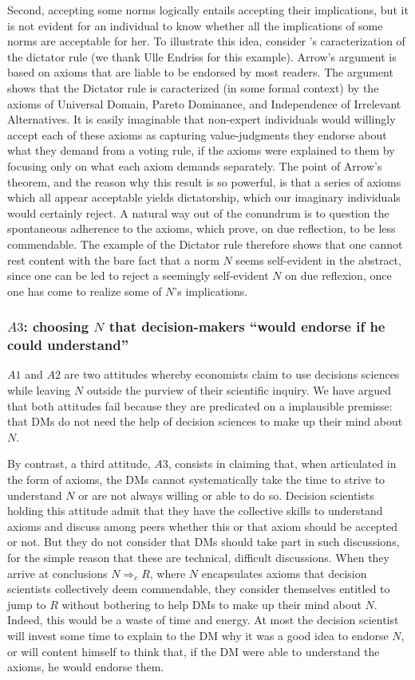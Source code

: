 \documentclass[preprint, french, english, 11pt, authoryear]{elsarticle}%
\newcommand{\protectforpdf}[1]{\texorpdfstring{\ensuremath{#1}}{#1}}
\begin{document}
Second, accepting some norms logically entails accepting their implications, but it is not evident for an individual to know whether all the implications of some norms are acceptable for her. To illustrate this idea, consider \citeauthor{arrow_social_2012}’s \citeyearpar{arrow_social_2012} caracterization of the dictator rule (we thank Ulle Endriss for this example). Arrow's argument is based on axioms that are liable to be endorsed by most readers. The argument shows that the Dictator rule is caracterized (in some formal context) by the axioms of Universal Domain, Pareto Dominance, and Independence of Irrelevant Alternatives. It is easily imaginable that non-expert individuals would willingly accept each of these axioms as capturing value-judgments they endorse about what they demand from a voting rule, if the axioms were explained to them by focusing only on what each axiom demands separately. The point of Arrow's theorem, and the reason why this result is so powerful, is that a series of axioms which all appear acceptable yields dictatorship, which our imaginary individuals would certainly reject. A natural way out of the conundrum is to question the spontaneous adherence to the axioms, which prove, on due reflection, to be less commendable. The example of the Dictator rule therefore shows that one cannot rest content with the bare fact that a norm $N$ seems self-evident in the abstract, since one can be led to reject a seemingly self-evident $N$ on due reflexion, once one has come to realize some of $N$'s implications.

\subsubsection{\protectforpdf{A3}: choosing \protectforpdf{N} that decision-makers “would endorse if he could understand”}
$A1$ and $A2$ are two attitudes whereby economists claim to use decisions sciences while leaving $N$ outside the purview of their scientific inquiry. We have argued that both attitudes fail because they are predicated on a implausible premisse: that \acp{DM} do not need the help of decision sciences to make up their mind about $N$.

By contrast, a third attitude, $A3$, consists in claiming that, when articulated in the form of axioms, the \acp{DM} cannot systematically take the time to strive to understand $N$ or are not always willing or able to do so. Decision scientists holding this attitude admit that they have the collective skills to understand axioms and discuss among peers whether this or that axiom should be accepted or not. But they do not consider that \acp{DM} should take part in such discussions, for the simple reason that these are technical, difficult discussions. When they arrive at conclusions $N ⇒_c R$, where $N$ encapsulates axioms that decision scientists collectively deem commendable, they consider themselves entitled to jump to $R$ without bothering to help \acp{DM} to make up their mind about $N$. Indeed, this would be a waste of time and energy. At most the decision scientist will invest some time to explain to the \ac{DM} why it was a good idea to endorse $N$, or will content himself to think that, if the \ac{DM} were able to understand the axioms, he would endorse them.
\end{document}
